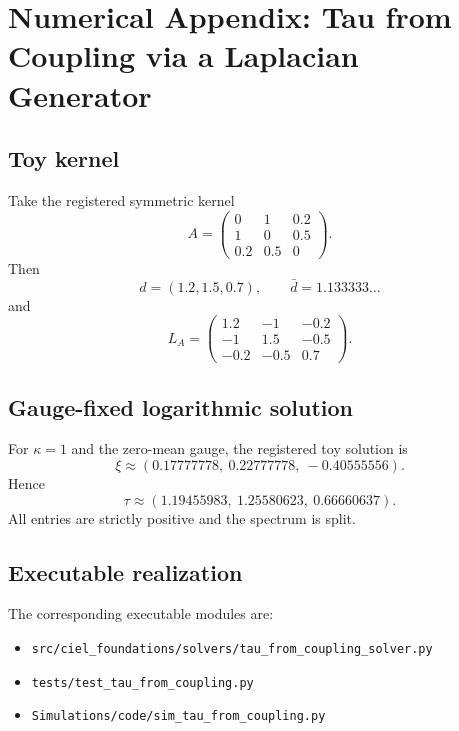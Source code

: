 \appendix
\section{Numerical Appendix: Tau from Coupling via a Laplacian Generator}
\label{app:tau-from-coupling}

\subsection{Toy kernel}
Take the registered symmetric kernel
\begin{equation}
A = \begin{pmatrix}
0 & 1 & 0.2 \\
1 & 0 & 0.5 \\
0.2 & 0.5 & 0
\end{pmatrix}.
\end{equation}
Then
\begin{equation}
d = (1.2, 1.5, 0.7),
\qquad
\bar d = 1.133333\ldots
\end{equation}
and
\begin{equation}
L_A = \begin{pmatrix}
1.2 & -1 & -0.2 \\
-1 & 1.5 & -0.5 \\
-0.2 & -0.5 & 0.7
\end{pmatrix}.
\end{equation}

\subsection{Gauge-fixed logarithmic solution}
For $\kappa=1$ and the zero-mean gauge, the registered toy solution is
\begin{equation}
\xi \approx (0.17777778,\ 0.22777778,\ -0.40555556).
\end{equation}
Hence
\begin{equation}
\tau \approx (1.19455983,\ 1.25580623,\ 0.66660637).
\end{equation}
All entries are strictly positive and the spectrum is split.

\subsection{Executable realization}
The corresponding executable modules are:
\begin{itemize}
  \item \texttt{src/ciel\_foundations/solvers/tau\_from\_coupling\_solver.py}
  \item \texttt{tests/test\_tau\_from\_coupling.py}
  \item \texttt{Simulations/code/sim\_tau\_from\_coupling.py}
\end{itemize}
